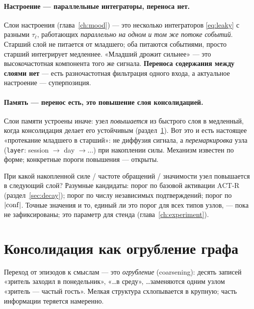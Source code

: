 \paragraph{Настроение — параллельные интеграторы, переноса нет.}
Слои настроения (глава~\ref{ch:mood}) — это несколько интеграторов
\eqref{eq:leaky} с разными $\tau_\ell$, работающих \emph{параллельно на одном и том
же потоке событий}. Старший слой не питается от младшего; оба питаются событиями,
просто старший интегрирует медленнее. «Младший дрожит сильнее» — это высокочастотная
компонента того же сигнала. \textbf{Переноса содержания между слоями нет} — есть
разночастотная фильтрация одного входа, а актуальное настроение — суперпозиция.

\paragraph{Память — перенос есть, это повышение слоя консолидацией.}
Слои памяти устроены иначе: узел \emph{повышается} из быстрого слоя в медленный, когда
консолидация делает его устойчивым (раздел~\ref{sec:consolidation}). Вот это и есть
настоящее «протекание младшего в старший»: не диффузия сигнала, а
\emph{перемаркировка} узла (\texttt{layer}: session $\to$ day $\to \dots$) при
накоплении силы. Механизм известен по форме; конкретные пороги повышения — открыты.

\begin{openq}
При какой накопленной силе / частоте обращений / значимости узел повышается в
следующий слой? Разумные кандидаты: порог по базовой активации ACT-R
(раздел~\ref{sec:decay}); порог по числу независимых подтверждений; порог по
$|\mathrm{conf}|$. Точные значения и то, единый ли это порог для всех типов узлов, — пока не
зафиксированы; это параметр для стенда (глава~\ref{ch:experiment}).
\end{openq}

\section{Консолидация как огрубление графа}
\label{sec:consolidation}

Переход от эпизодов к смыслам — это \emph{огрубление} (coarsening): десять записей
«зритель заходил в понедельник», «\ldots в среду», \ldots заменяются одним узлом
«зритель — частый гость». Мелкая структура схлопывается в крупную; часть информации
теряется намеренно.

